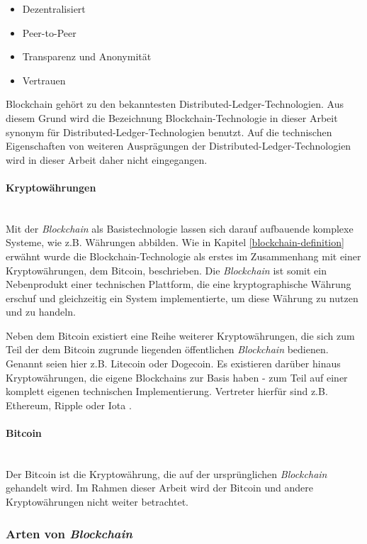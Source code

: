 \begin{itemize}
  \item Dezentralisiert
  \item Peer-to-Peer
  \item Transparenz und Anonymität
  \item Vertrauen
\end{itemize}

Blockchain gehört zu den bekanntesten Distributed-Ledger-Technologien. Aus diesem Grund wird die Bezeichnung Blockchain-Technologie in dieser Arbeit synonym für Distributed-Ledger-Technologien benutzt. Auf die technischen Eigenschaften von weiteren Ausprägungen der Distributed-Ledger-Technologien wird in dieser Arbeit daher nicht eingegangen.

\paragraph{Kryptowährungen}$~~$\\
Mit der \textit{Blockchain} als Basistechnologie lassen sich darauf aufbauende komplexe Systeme, wie z.B. Währungen abbilden. Wie in Kapitel \ref{blockchain-definition} erwähnt wurde die Blockchain-Technologie als erstes im Zusammenhang mit einer Kryptowährungen, dem Bitcoin, beschrieben. Die \textit{Blockchain} ist somit ein Nebenprodukt einer technischen Plattform, die eine kryptographische Währung erschuf und gleichzeitig ein System implementierte, um diese Währung zu nutzen und zu handeln.

Neben dem Bitcoin existiert eine Reihe weiterer Kryptowährungen, die sich zum Teil der dem Bitcoin zugrunde liegenden öffentlichen \textit{Blockchain} bedienen. Genannt seien hier z.B. Litecoin oder Dogecoin. Es existieren darüber hinaus Kryptowährungen, die eigene Blockchains zur Basis haben - zum Teil auf einer komplett eigenen technischen Implementierung. Vertreter hierfür sind z.B. Ethereum, Ripple oder Iota \citep[siehe auch][]{Buterin2014, carVertical, JPMorgan2018}.

\paragraph{Bitcoin}$~~$\\
Der Bitcoin ist die Kryptowährung, die auf der ursprünglichen \textit{Blockchain} gehandelt wird. Im Rahmen dieser Arbeit wird der Bitcoin und andere Kryptowährungen nicht weiter betrachtet.

\subsubsection{Arten von \textit{Blockchain}} \label{Arten-von-Blockchain}

